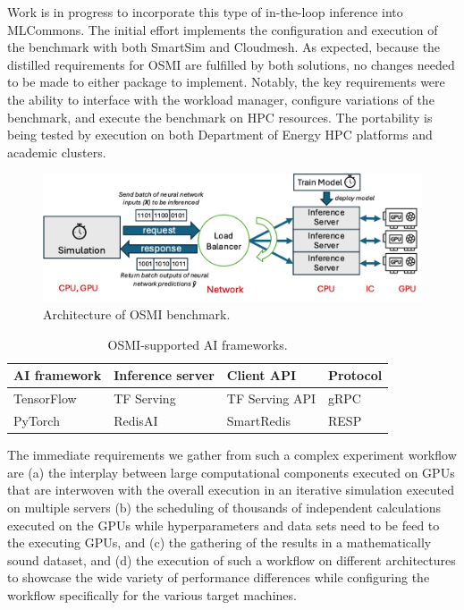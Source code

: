 \documentclass[sigconf]{acmart}
\begin{document}
Work is in progress to incorporate this type of in-the-loop inference into MLCommons. The initial effort implements the configuration and execution of the benchmark with both SmartSim and Cloudmesh. As expected, because the distilled requirements for OSMI are fulfilled by both solutions, no changes needed to be made to either package to implement. Notably, the key requirements were the ability to interface with the workload manager, configure variations of the benchmark, and execute the benchmark on HPC resources. The portability is being tested by execution on both Department of Energy HPC platforms and academic clusters.

\begin{figure}[htb]
    \centering
    \includegraphics[width=\linewidth]{images/osmi_arch.png}
    \caption{Architecture of OSMI benchmark.}
    \label{fig:osmi}
\end{figure}

\begin{table}[htb]
\centering
\renewcommand{\arraystretch}{1.5}
\begin{tabular}{llll}
\hline
\textbf{AI framework} & \textbf{Inference server} & \textbf{Client API} & \textbf{Protocol} \\ \hline
TensorFlow & TF Serving  & TF Serving API  & gRPC  \\
PyTorch    & RedisAI     & SmartRedis      & RESP  \\ \hline
\end{tabular}
\caption{OSMI-supported AI frameworks.}
\label{tab:osmi}
\end{table}

\begin{BOX}
The immediate requirements we gather from such a complex experiment workflow are (a) the interplay between large computational components executed on GPUs that are interwoven with the overall execution in an iterative simulation executed on multiple servers (b) the scheduling of thousands of independent calculations executed on the GPUs while hyperparameters and data sets need to be feed to the executing GPUs, and (c) the gathering of the results in a mathematically sound dataset, and (d) the execution of such a workflow on different architectures to showcase the wide variety of performance differences while configuring the workflow specifically for the various target machines.
\end{BOX}
\end{document}

